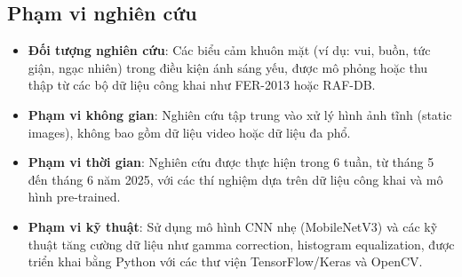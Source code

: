 \subsection{Phạm vi nghiên cứu}
\begin{itemize}
    \item \textbf{Đối tượng nghiên cứu}: Các biểu cảm khuôn mặt (ví dụ: vui, buồn, tức giận, ngạc nhiên) trong điều kiện ánh sáng yếu, được mô phỏng hoặc thu thập từ các bộ dữ liệu công khai như FER-2013 hoặc RAF-DB.
    \item \textbf{Phạm vi không gian}: Nghiên cứu tập trung vào xử lý hình ảnh tĩnh (static images), không bao gồm dữ liệu video hoặc dữ liệu đa phổ.
    \item \textbf{Phạm vi thời gian}: Nghiên cứu được thực hiện trong 6 tuần, từ tháng 5 đến tháng 6 năm 2025, với các thí nghiệm dựa trên dữ liệu công khai và mô hình pre-trained.
    \item \textbf{Phạm vi kỹ thuật}: Sử dụng mô hình CNN nhẹ (MobileNetV3) và các kỹ thuật tăng cường dữ liệu như gamma correction, histogram equalization, được triển khai bằng Python với các thư viện TensorFlow/Keras và OpenCV.
\end{itemize}